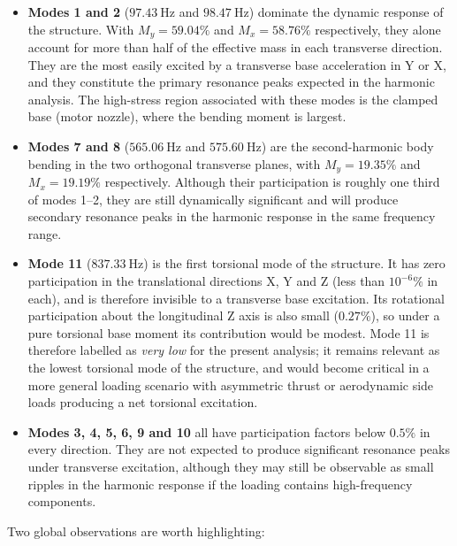 \begin{itemize}
    \item \textbf{Modes 1 and 2} ($\SI{97.43}{\hertz}$ and $\SI{98.47}{\hertz}$) dominate the dynamic response of the structure. With $M_y = 59.04\%$ and $M_x = 58.76\%$ respectively, they alone account for more than half of the effective mass in each transverse direction. They are the most easily excited by a transverse base acceleration in Y or X, and they constitute the primary resonance peaks expected in the harmonic analysis. The high-stress region associated with these modes is the clamped base (motor nozzle), where the bending moment is largest.

    \item \textbf{Modes 7 and 8} ($\SI{565.06}{\hertz}$ and $\SI{575.60}{\hertz}$) are the second-harmonic body bending in the two orthogonal transverse planes, with $M_y = 19.35\%$ and $M_x = 19.19\%$ respectively. Although their participation is roughly one third of modes 1--2, they are still dynamically significant and will produce secondary resonance peaks in the harmonic response in the same frequency range.

    \item \textbf{Mode 11} ($\SI{837.33}{\hertz}$) is the first torsional mode of the structure. It has zero participation in the translational directions X, Y and Z (less than $10^{-6}\%$ in each), and is therefore invisible to a transverse base excitation. Its rotational participation about the longitudinal Z axis is also small ($0.27\%$), so under a pure torsional base moment its contribution would be modest. Mode 11 is therefore labelled as \emph{very low} for the present analysis; it remains relevant as the lowest torsional mode of the structure, and would become critical in a more general loading scenario with asymmetric thrust or aerodynamic side loads producing a net torsional excitation.

    \item \textbf{Modes 3, 4, 5, 6, 9 and 10} all have participation factors below $0.5\%$ in every direction. They are not expected to produce significant resonance peaks under transverse excitation, although they may still be observable as small ripples in the harmonic response if the loading contains high-frequency components.
\end{itemize}

Two global observations are worth highlighting:

